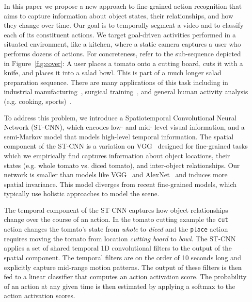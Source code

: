 \documentclass[runningheads]{llncs}
\begin{document}
In this paper we propose a new approach to fine-grained action recognition that aims to capture information about object states, their relationships, and how they change over time.
Our goal is to temporally segment a video and to classify each of its constituent actions. 
We target goal-driven activities performed in a situated environment, like a kitchen, where a static camera captures a user who performs dozens of actions. For concreteness, refer to the sub-sequence depicted in Figure~\ref{fig:cover}: A user places a tomato onto a cutting board, cuts it with a knife, and places it into a salad bowl. This is part of a much longer salad preparation sequence.
There are many applications of this task including in
industrial manufacturing~\cite{vo_cvpr_2014,hawkins_icra_2014}, surgical training~\cite{JIGSAWS,zappella_media_2013,tao_miccai_2013}, and general human activity analysis (e.g. cooking, sports)~\cite{rohrbach_ijcv_2015,li_cvpr_2015,lei_ubicomp_2012,morariu_cvpr_2011,koppula_ijrr_2013,van_jaise_2010}. 

To address this problem, we introduce a Spatiotemporal Convolutional Neural Network (ST-CNN), which encodes low- and mid- level visual information, and a semi-Markov model that models high-level temporal information. 
The spatial component of the ST-CNN is a variation on VGG~\cite{VGG} designed for fine-grained tasks which we empirically find captures information about object locations, their states (e.g. whole tomato vs. diced tomato), and inter-object relationships.  
Our network is smaller than models like VGG~\cite{VGG} and AlexNet~\cite{alexnet} and induces more spatial invariance. 
This model diverges from recent fine-grained models, which typically use holistic approaches to model the scene. 

The temporal component of the ST-CNN captures how object relationships change over the course of an action. In the tomato cutting example the \texttt{cut} action changes the tomato's state from \textit{whole} to \textit{diced} and the \texttt{place} action requires moving the tomato from location \textit{cutting board} to \textit{bowl}. 
The ST-CNN applies a set of shared temporal 1D convolutional filters to the output of the spatial component. The temporal filters are on the order of 10 seconds long and explicitly capture mid-range motion patterns. The output of these filters is then fed to a linear classifier that computes an action activation score.
The probability of an action at any given time is then estimated by applying a softmax to the action activation scores.
\end{document}
